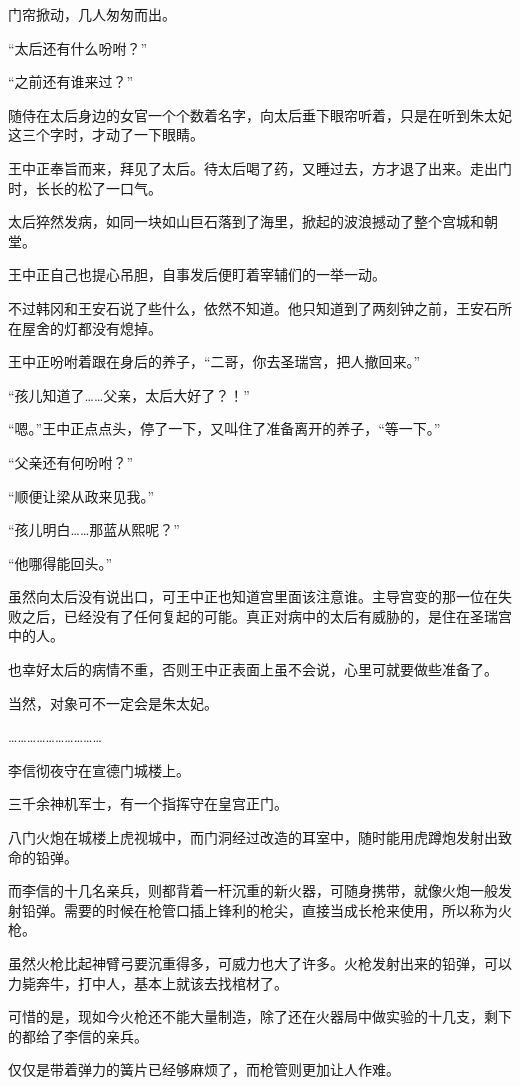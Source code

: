 门帘掀动，几人匆匆而出。

“太后还有什么吩咐？”

“之前还有谁来过？”

随侍在太后身边的女官一个个数着名字，向太后垂下眼帘听着，只是在听到朱太妃这三个字时，才动了一下眼睛。

王中正奉旨而来，拜见了太后。待太后喝了药，又睡过去，方才退了出来。走出门时，长长的松了一口气。

太后猝然发病，如同一块如山巨石落到了海里，掀起的波浪撼动了整个宫城和朝堂。

王中正自己也提心吊胆，自事发后便盯着宰辅们的一举一动。

不过韩冈和王安石说了些什么，依然不知道。他只知道到了两刻钟之前，王安石所在屋舍的灯都没有熄掉。

王中正吩咐着跟在身后的养子，“二哥，你去圣瑞宫，把人撤回来。”

“孩儿知道了……父亲，太后大好了？！”

“嗯。”王中正点点头，停了一下，又叫住了准备离开的养子，“等一下。”

“父亲还有何吩咐？”

“顺便让梁从政来见我。”

“孩儿明白……那蓝从熙呢？”

“他哪得能回头。”

虽然向太后没有说出口，可王中正也知道宫里面该注意谁。主导宫变的那一位在失败之后，已经没有了任何复起的可能。真正对病中的太后有威胁的，是住在圣瑞宫中的人。

也幸好太后的病情不重，否则王中正表面上虽不会说，心里可就要做些准备了。

当然，对象可不一定会是朱太妃。

…………………………

李信彻夜守在宣德门城楼上。

三千余神机军士，有一个指挥守在皇宫正门。

八门火炮在城楼上虎视城中，而门洞经过改造的耳室中，随时能用虎蹲炮发射出致命的铅弹。

而李信的十几名亲兵，则都背着一杆沉重的新火器，可随身携带，就像火炮一般发射铅弹。需要的时候在枪管口插上锋利的枪尖，直接当成长枪来使用，所以称为火枪。

虽然火枪比起神臂弓要沉重得多，可威力也大了许多。火枪发射出来的铅弹，可以力毙奔牛，打中人，基本上就该去找棺材了。

可惜的是，现如今火枪还不能大量制造，除了还在火器局中做实验的十几支，剩下的都给了李信的亲兵。

仅仅是带着弹力的簧片已经够麻烦了，而枪管则更加让人作难。

